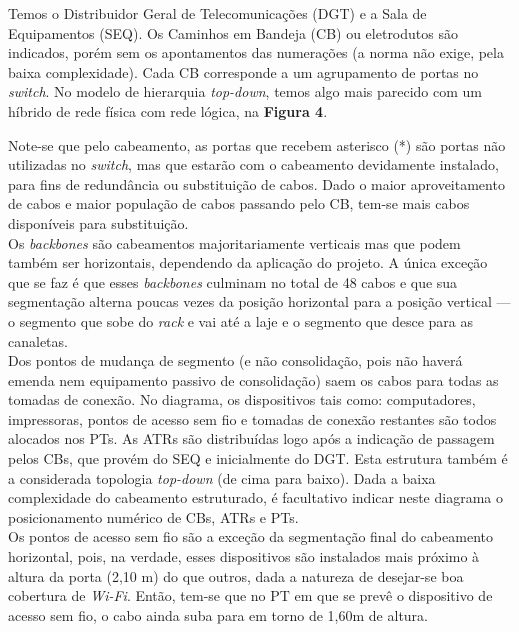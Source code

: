 \documentclass[	DIV=calc,%
							paper=a4,%
							fontsize=12pt,%
							onecolumn]{scrartcl}	 					%
\begin{document}
Temos o Distribuidor Geral de Telecomunicações (DGT) e a Sala de Equipamentos (SEQ). Os Caminhos em Bandeja (CB) ou eletrodutos são indicados, porém sem os apontamentos das numerações (a norma não exige, pela baixa complexidade). Cada CB corresponde a um agrupamento de portas no \textit{switch}. No modelo de hierarquia \textit{top-down}, temos algo mais parecido com um híbrido de rede física com rede lógica, na \textbf{Figura 4}. 





Note-se que pelo cabeamento, as portas que recebem asterisco (*) são portas não utilizadas no \textit{switch}, mas que estarão com o cabeamento devidamente instalado, para fins de redundância ou substituição de cabos. Dado o maior aproveitamento de cabos e maior população de cabos passando pelo CB, tem-se mais cabos disponíveis para substituição.
\\

Os \textit{backbones} são cabeamentos majoritariamente verticais mas que podem também ser horizontais, dependendo da aplicação do projeto. A única exceção que se faz é que esses \textit{backbones} culminam no total de 48 cabos e que sua segmentação alterna poucas vezes da posição horizontal para a posição vertical --- o segmento que sobe do \textit{rack} e vai até a laje e o segmento que desce para as canaletas.
\\

Dos pontos de mudança de segmento (e não consolidação, pois não haverá emenda nem equipamento passivo de consolidação) saem os cabos para todas as tomadas de conexão. No diagrama, os dispositivos tais como: computadores, impressoras, pontos de acesso sem fio e tomadas de conexão restantes são todos alocados nos PTs. As ATRs são distribuídas logo após a indicação de passagem pelos CBs, que provém do SEQ e inicialmente do DGT. Esta estrutura também é a considerada topologia \textit{top-down} (de cima para baixo). Dada a baixa complexidade do cabeamento estruturado, é facultativo indicar neste diagrama o posicionamento numérico de CBs, ATRs e PTs.
\\

Os pontos de acesso sem fio são a exceção da segmentação final do cabeamento horizontal, pois, na verdade, esses dispositivos são instalados mais próximo à altura da porta (2,10 m) do que outros, dada a natureza de desejar-se boa cobertura de \textit{Wi-Fi}. Então, tem-se que no PT em que se prevê o dispositivo de acesso sem fio, o cabo ainda suba para em torno de 1,60m de altura.
\end{document}
